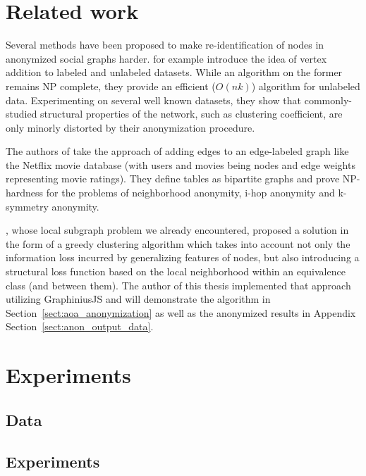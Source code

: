 \documentclass{llncs}
\begin{document}
\section{Related work}
\label{sect:related_work}


Several methods have been proposed to make re-identification of nodes in anonymized social graphs harder.	\cite{chester2011k} for example introduce the idea of vertex addition to labeled and unlabeled datasets. While an algorithm on the former remains NP complete, they provide an efficient ($O(nk)$) algorithm for unlabeled data. Experimenting on several well known datasets, they show that commonly-studied structural properties of the network, such as clustering coefficient, are only minorly distorted by their anonymization procedure.

The authors of \cite{kapron2011social} take the approach of adding edges to an edge-labeled graph like the Netflix movie database (with users and movies being nodes and edge weights representing movie ratings). They define tables as bipartite graphs and prove NP-hardness for the problems of neighborhood anonymity, i-hop anonymity and k-symmetry anonymity.

\cite{campan2009data}, whose local subgraph problem we already encountered, proposed a solution in the form of a greedy clustering algorithm which takes into account not only the information loss incurred by generalizing features of nodes, but also introducing a structural loss function based on the local neighborhood within an equivalence class (and between them). The author of this thesis implemented that approach utilizing GraphiniusJS and will demonstrate the algorithm in Section~\ref{sect:aoa_anonymization} as well as the anonymized results in Appendix Section~\ref{sect:anon_output_data}.


\section{Experiments}
\label{sect:experiments}


\subsection{Data} 
\label{ssect:data}


\subsection{Experiments}
\label{ssect:experiments}
\end{document}
